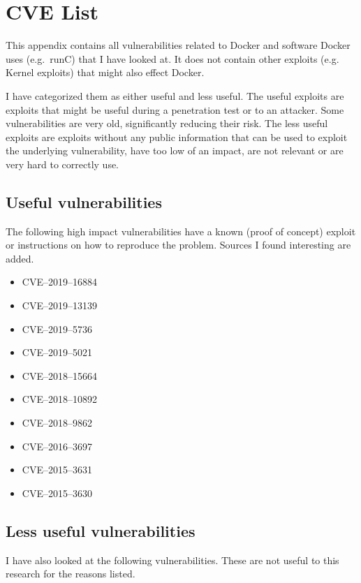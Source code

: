 \chapter{CVE List}\label{appendix:CVE-List}

This appendix contains all vulnerabilities related to Docker and software Docker uses (e.g.\ runC) that I have looked at. It does not contain other exploits (e.g. Kernel exploits) that might also effect Docker.

I have categorized them as either useful and less useful. The useful exploits are exploits that might be useful during a penetration test or to an attacker. Some vulnerabilities are very old, significantly reducing their risk. The less useful exploits are exploits without any public information that can be used to exploit the underlying vulnerability, have too low of an impact, are not relevant or are very hard to correctly use.

\section{Useful vulnerabilities}
The following high impact vulnerabilities have a known (proof of concept) exploit or instructions on how to reproduce the problem. Sources I found interesting are added.

\begin{itemize}
    \item CVE--2019--16884\cite{CVE-2019-16884-Github}
    \item CVE--2019--13139\cite{CVE-2019-13139-STAALDRAAD}
    \item CVE--2019--5736\cite{CVE-2019-5736-DragonSector}\cite{CVE-2019-5736-Github}\cite{CVE-2019-5736-Twistlock}
    \item CVE--2019--5021\cite{CVE-2019-5021-Talos}\cite{CVE-2019-5021-Alpine}
    \item CVE--2018--15664\cite{CVE-2018-15664-Openwall}\cite{CVE-2018-15664-Bugzilla}
    \item CVE--2018--10892\cite{CVE-2018-10892-Github}
    \item CVE--2018--9862\cite{CVE-2018-9862-Github}
    \item CVE--2016--3697\cite{CVE-2016-3697-Github}
    \item CVE--2015--3631\cite{CVE-2015-363-Seclists}
    \item CVE--2015--3630\cite{CVE-2015-363-Seclists}
\end{itemize}

\section{Less useful vulnerabilities}
I have also looked at the following vulnerabilities. These are not useful to this research for the reasons listed.

